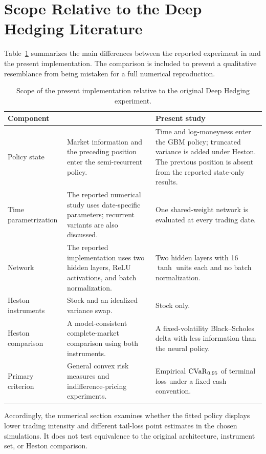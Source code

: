 \section{Scope Relative to the Deep Hedging Literature}
\label{sec:scope}

Table~\ref{tab:scope} summarizes the main differences between the reported
experiment in \citet{buehler2019} and the present implementation. The comparison
is included to prevent a qualitative resemblance from being mistaken for a
full numerical reproduction.

\begin{table}[htbp]
\centering
\caption{Scope of the present implementation relative to the original Deep
Hedging experiment.}
\label{tab:scope}
\begin{tabular}{>{\raggedright\arraybackslash}p{}
                >{\raggedright\arraybackslash}p{}
                >{\raggedright\arraybackslash}p{}}
\toprule
Component & \citet{buehler2019} & Present study \\
\midrule
Policy state
& Market information and the preceding position enter the semi-recurrent policy.
& Time and log-moneyness enter the GBM policy; truncated variance is added under
Heston. The previous position is absent from the reported state-only results. \\
\addlinespace
Time parametrization
& The reported numerical study uses date-specific parameters; recurrent variants
are also discussed.
& One shared-weight network is evaluated at every trading date. \\
\addlinespace
Network
& The reported implementation uses two hidden layers, ReLU activations, and batch
normalization.
& Two hidden layers with 16 $\tanh$ units each and no batch normalization. \\
\addlinespace
Heston instruments
& Stock and an idealized variance swap.
& Stock only. \\
\addlinespace
Heston comparison
& A model-consistent complete-market comparison using both instruments.
& A fixed-volatility Black--Scholes delta with less information than the neural
policy. \\
\addlinespace
Primary criterion
& General convex risk measures and indifference-pricing experiments.
& Empirical $\operatorname{CVaR}_{0.95}$ of terminal loss under a fixed cash convention. \\
\bottomrule
\end{tabular}
\end{table}

Accordingly, the numerical section examines whether the fitted policy displays
lower trading intensity and different tail-loss point estimates in the chosen
simulations. It does not test equivalence to the original architecture,
instrument set, or Heston comparison.
